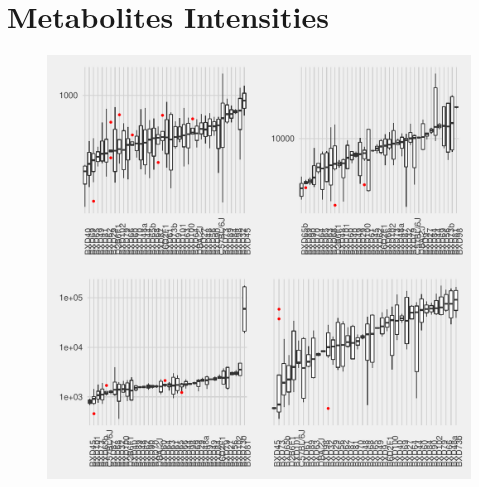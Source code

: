 \documentclass[a4paper,11pt,twoside]{book}
\begin{document}
\begin{subappendices}
\begin{figure}[bht!]
\end{figure}

\clearpage

\section{Metabolites Intensities}
\begin{figure}[ht!b]
	\centering
	\includegraphics[width=\linewidth]{Appendix_FIgures/4_Single_metab_plots.pdf}
\end{figure}

\clearpage


\end{subappendices}
\end{document}
